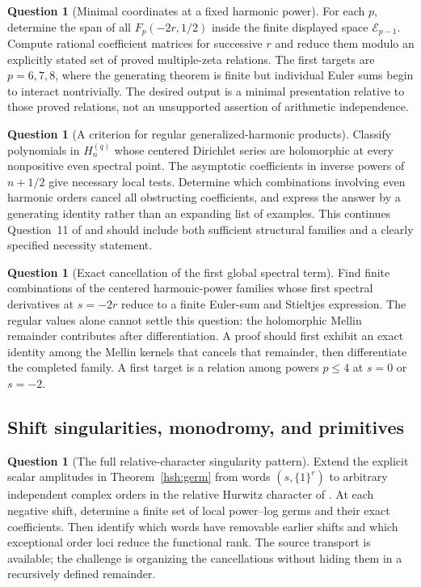 \documentclass[11pt,a4paper]{article}
\numberwithin{equation}{section}
\theoremstyle{definition}
\newtheorem{question}[theorem]{Question}
\theoremstyle{remark}
\begin{document}
\begin{question}[Minimal coordinates at a fixed harmonic power]
For each $p$, determine the span of all $F_p(-2r,1/2)$ inside the
finite displayed space $\mathcal E_{p-1}$. Compute rational
coefficient matrices for successive $r$ and reduce them modulo an
explicitly stated set of proved multiple-zeta relations. The first
targets are $p=6,7,8$, where the generating theorem is finite but
individual Euler sums begin to interact nontrivially. The desired
output is a minimal presentation relative to those proved relations,
not an unsupported assertion of arithmetic independence.
\end{question}

\begin{question}[A criterion for regular generalized-harmonic products]
Classify polynomials in $H_n^{(q)}$ whose centered Dirichlet series
are holomorphic at every nonpositive even spectral point. The
asymptotic coefficients in inverse powers of $n+1/2$ give necessary
local tests. Determine which combinations involving even harmonic
orders cancel all obstructing coefficients, and express the answer
by a generating identity rather than an expanding list of examples.
This continues Question~11 of \cite{RepoExactResonant} and should
include both sufficient structural families and a clearly specified
necessity statement.
\end{question}

\begin{question}[Exact cancellation of the first global spectral term]
Find finite combinations of the centered harmonic-power families
whose first spectral derivatives at $s=-2r$ reduce to a finite
Euler-sum and Stieltjes expression. The regular values alone cannot
settle this question: the holomorphic Mellin remainder contributes
after differentiation. A proof should first exhibit an exact
identity among the Mellin kernels that cancels that remainder, then
differentiate the completed family. A first target is a relation
among powers $p\le4$ at $s=0$ or $s=-2$.
\end{question}

\subsection{Shift singularities, monodromy, and primitives}

\begin{question}[The full relative-character singularity pattern]
Extend the explicit scalar amplitudes in Theorem~\ref{hsh:germ}
from words $(s,\{1\}^r)$ to arbitrary independent complex orders
in the relative Hurwitz character of \cite{RepoIndependent}.
At each negative shift, determine a finite set of local power--log
germs and their exact coefficients. Then identify which words have
removable earlier shifts and which exceptional order loci reduce the
functional rank. The source transport is available; the challenge
is organizing the cancellations without hiding them in a recursively
defined remainder.
\end{question}
\end{document}
